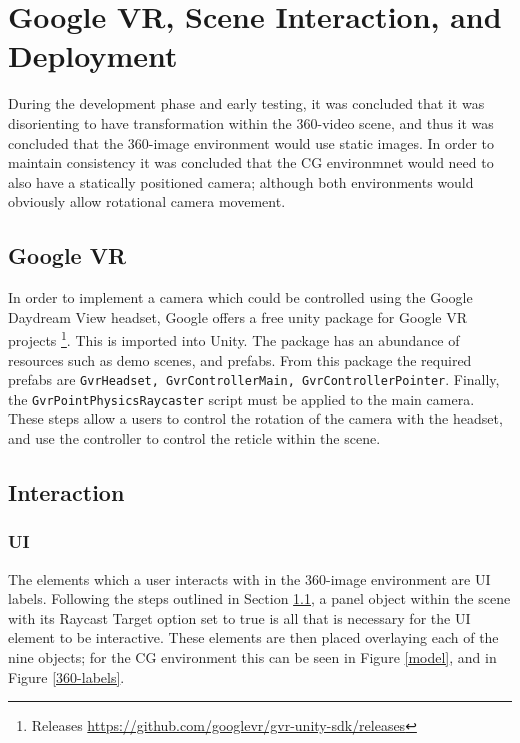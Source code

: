 \documentclass[a4paper, openright, twoside]{book}
\begin{document}
\section{Google VR, Scene Interaction, and Deployment}
During the development phase and early testing, it was concluded that it was disorienting to have transformation within the 360-video scene, and thus it was concluded that the 360-image environment would use static images. In order to maintain consistency it was concluded that the CG environmnet would need to also have a statically positioned camera; although both environments would obviously allow rotational camera movement.  

\subsection{Google VR}\label{googlevr}

In order to implement a camera which could be controlled using the Google Daydream View headset, Google offers a free unity package for Google VR projects \footnote{Releases \url{https://github.com/googlevr/gvr-unity-sdk/releases}}. This is imported into Unity. The package has an abundance of resources such as demo scenes, and prefabs. From this package the required prefabs are \lstinline{GvrHeadset, GvrControllerMain, GvrControllerPointer}. Finally, the \lstinline{GvrPointPhysicsRaycaster} script must be applied to the main camera. These steps allow a users to control the rotation of the camera with the headset, and use the controller to control the reticle within the scene. 

\subsection{Interaction}

\subsubsection{UI}
The elements which a user interacts with in the 360-image environment are UI labels. Following the steps outlined in Section \ref{googlevr}, a panel object within the scene with its Raycast Target option set to true is all that is necessary for the UI element to be interactive. These elements are then placed overlaying each of the nine objects; for the CG environment this can be seen in Figure \ref{model}, and in Figure \ref{360-labels}. 
\end{document}
